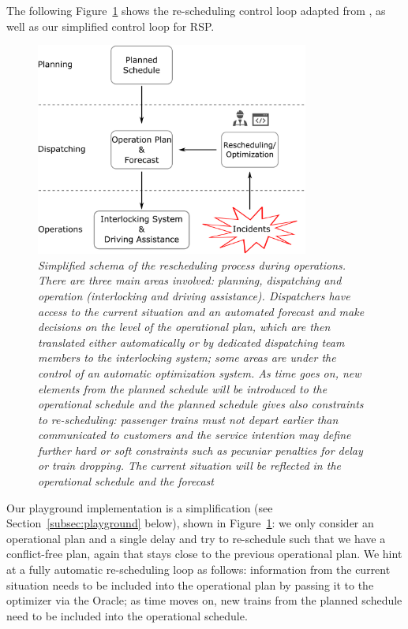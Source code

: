 \documentclass{article}
\begin{document}
The following Figure~\ref{fig:introduction_operations} shows the re-scheduling control loop adapted from \cite{rcsbrochure,rcswhitepaper}, as well as our simplified control loop for RSP.
%
\begin{figure}[hbtp]
	\centering
  \includegraphics[width=0.8\textwidth]{Figures/rescheduling_schema_heute.pdf}
	\caption{\textit{Simplified schema of the rescheduling process during operations. There are three main areas involved: \emph{planning}, \emph{dispatching} and \emph{operation} (interlocking and driving assistance). Dispatchers have access to the current situation and an automated forecast and make decisions on the level of the operational plan, which are then translated either automatically or by dedicated dispatching team members to the interlocking system; some areas are under the control of an automatic optimization system. As time goes on, new elements from the planned schedule will be introduced to the operational schedule and the planned schedule gives also constraints to re-scheduling: passenger trains must not depart earlier than communicated to customers and the service intention may define further hard or soft constraints such as pecuniar penalties for delay or train dropping. The current situation will be reflected in the operational schedule and the forecast}}
	\label{fig:introduction_operations}
\end{figure}
%

Our playground implementation is a simplification (see Section~\ref{subsec:playground} below), shown in Figure~\ref{fig:introduction_operations}: we only consider an operational plan and a single delay and try to re-schedule such that we have a conflict-free plan, again that stays close to the previous operational plan. We hint at a fully automatic re-scheduling loop as follows: information from the current situation needs to be included into the operational plan by passing it to the optimizer via the Oracle; as time moves on, new trains from the planned schedule need to be included into the operational schedule.
\end{document}
